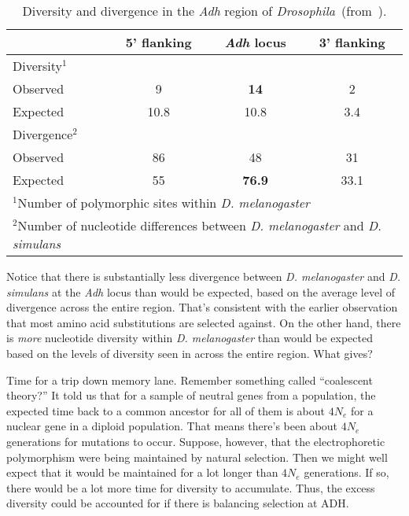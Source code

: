 \documentclass[12pt]{article}
\begin{document}
\begin{table}
\begin{center}
\begin{tabular}{l|ccc}
\hline\hline
         & 5' flanking & {\it Adh\/} locus & 3' flanking \\
\hline
Diversity$^1$ \\
\quad Observed & 9     & {\bf 14}   & 2    \\
\quad Expected & 10.8  & 10.8 & 3.4  \\
Divergence$^2$ \\
\quad Observed & 86    & 48   & 31   \\
\quad Expected & 55    & {\bf 76.9} & 33.1 \\
\hline
\multicolumn{4}{l}{$^1$Number of polymorphic sites within {\it
         D. melanogaster\/}} \\
\multicolumn{4}{l}{$^2$Number of nucleotide differences between {\it
         D. melanogaster\/} and {\it D. simulans}}
\end{tabular}
\end{center}
\caption{Diversity and divergence in the {\it Adh\/} region of {\it
    Drosophila}~(from~\cite{Kreitman-Aguade86}).}\label{table:ka}
\end{table}

Notice that there is substantially less divergence between {\it
  D. melanogaster\/} and {\it D. simulans\/} at the {\it Adh\/} locus
than would be expected, based on the average level of divergence
across the entire region. That's consistent with the earlier
observation that most amino acid substitutions are selected
against. On the other hand, there is {\it more\/} nucleotide diversity
within {\it D. melanogaster\/} than would be expected based on the
levels of diversity seen in across the entire region. What gives?

Time for a trip down memory lane. Remember something called
``coalescent theory?'' It told us that for a sample of neutral genes
from a population, the expected time back to a common ancestor for all
of them is about $4N_e$ for a nuclear gene in a diploid
population. That means there's been about $4N_e$ generations for
mutations to occur. Suppose, however, that the electrophoretic
polymorphism were being maintained by natural selection. Then we might
well expect that it would be maintained for a lot longer than $4N_e$
generations. If so, there would be a lot more time for diversity to
accumulate. Thus, the excess diversity could be accounted for if there
is balancing selection at ADH.
\end{document}

